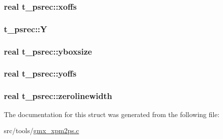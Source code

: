 \hypertarget{structt__psrec_aa1538adb1d83656c2b93a03e1ad64ab0}{
\subsubsection[{xoffs}]{\setlength{\rightskip}{0pt plus 5cm}real {\bf t\-\_\-psrec\-::xoffs}}}\label{structt__psrec_aa1538adb1d83656c2b93a03e1ad64ab0}
\hypertarget{structt__psrec_a976373d8ae55b441da6d429dae208f2d}{
\subsubsection[{\-Y}]{ {\bf t\-\_\-psrec\-::\-Y}}}\label{structt__psrec_a976373d8ae55b441da6d429dae208f2d}
\hypertarget{structt__psrec_a56a01cb580ec04c778293ef0b9a3f153}{
\subsubsection[{yboxsize}]{\setlength{\rightskip}{0pt plus 5cm}real {\bf t\-\_\-psrec\-::yboxsize}}}\label{structt__psrec_a56a01cb580ec04c778293ef0b9a3f153}
\hypertarget{structt__psrec_aec66c866e293aaf4825facb757c405b3}{
\subsubsection[{yoffs}]{\setlength{\rightskip}{0pt plus 5cm}real {\bf t\-\_\-psrec\-::yoffs}}}\label{structt__psrec_aec66c866e293aaf4825facb757c405b3}
\hypertarget{structt__psrec_a6917dee80347cabb36bfefd103ef4d85}{
\subsubsection[{zerolinewidth}]{\setlength{\rightskip}{0pt plus 5cm}real {\bf t\-\_\-psrec\-::zerolinewidth}}}\label{structt__psrec_a6917dee80347cabb36bfefd103ef4d85}


\-The documentation for this struct was generated from the following file\-:\begin{DoxyCompactItemize}
\item 
src/tools/\hyperlink{gmx__xpm2ps_8c}{gmx\-\_\-xpm2ps.\-c}\end{DoxyCompactItemize}
